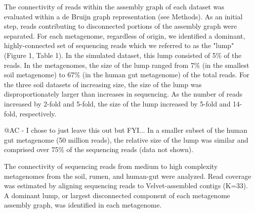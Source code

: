 \documentclass[11pt]{article} %
\begin{document}
The connectivity of reads within the assembly graph of each dataset was evaluated within a de Bruijn graph representation (see Methods).  As an initial step, reads contributing to disconnected portions of the assembly graph were separated.  For each metagenome, regardless of origin, we identified a dominant, highly-connected set of sequencing reads which we referred to as the "lump" (Figure 1, Table 1).  In the simulated dataset, this lump consisted of 5\% of the reads.  In the metagenomes, the size of the lump ranged from 7\% (in the smallest soil metagenome) to 67\% (in the human gut metagenome) of the total reads.  For the three soil datasets of increasing size, the size of the lump was disproportionately larger than increases in sequencing.  As the number of reads increased by 2-fold and 5-fold, the size of the lump increased by 5-fold and 14-fold, respectively.  

@AC - I chose to just leave this out but FYI...  In a smaller subset of the human gut metagenome (50 million reads), the relative size of the lump was similar and comprised over 75\% of the sequencing reads (data not shown). 

\begin{table}
\caption{The connectivity of sequencing reads from medium to high complexity metagenomes from the soil, rumen, and human-gut were analyzed.  Read coverage was estimated by aligning sequencing reads to Velvet-assembled contigs (K=33).  A dominant lump, or largest disconnected component of each metagenome assembly graph, was identified in each metagenome. }
\end{table}
\end{document}
